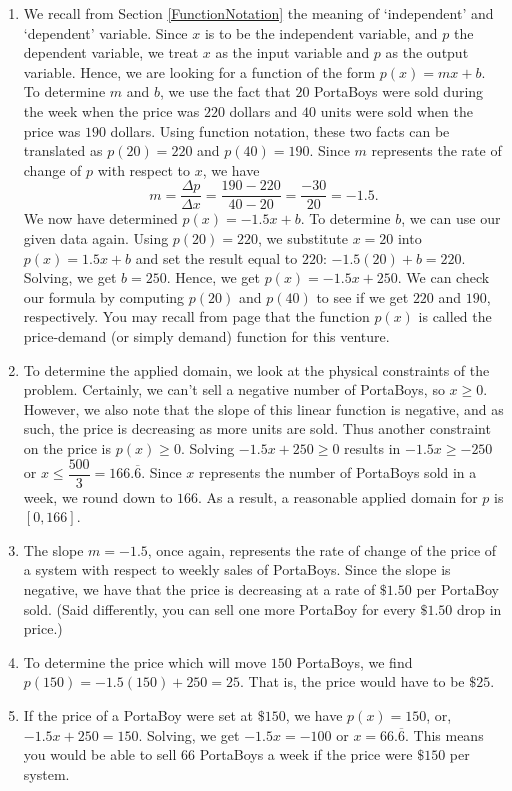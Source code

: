 {
\begin{enumerate}

\item  We recall from Section \ref{FunctionNotation} the meaning of `independent' and `dependent' variable.  Since $x$ is to be the independent variable, and $p$ the dependent variable, we treat $x$ as the input variable and $p$ as the output variable.  Hence, we are looking for a function of the form $p(x) = mx + b$.  To determine $m$ and $b$, we use the fact that $20$ PortaBoys were sold during the week when the price was $220$ dollars and $40$ units were sold when the price was $190$ dollars.  Using function notation, these two facts can be translated as $p(20)=220$ and $p(40)=190$.  Since $m$ represents the rate of change of $p$ with respect to $x$, we have  \[ m = \dfrac{\Delta p}{\Delta x} = \dfrac{190-220}{40-20} = \dfrac{-30}{20} = -1.5.\]  We now have determined $p(x) = -1.5 x + b$.  To determine $b$, we can use our given data again.  Using $p(20) = 220$, we substitute $x=20$ into $p(x) = 1.5x + b$ and set the result equal to $220$:  $-1.5(20)+b = 220$.  Solving, we get  $b = 250$. Hence, we get $p(x) = -1.5x + 250$.  We can check our formula by computing $p(20)$ and $p(40)$ to see if we get $220$ and $190$, respectively.  You may recall from page \pageref{pricerevenuecostprofit} that the function $p(x)$ is called the price-demand (or simply demand) function for this venture.

\item  To determine the applied domain, we look at the physical constraints of the problem.  Certainly, we can't sell a negative number of PortaBoys, so $x \geq 0$. However, we also note that the slope of this linear function is negative, and as such, the price is decreasing as more units are sold.  Thus another constraint on the price is $p(x)\geq 0$.  Solving $-1.5 x + 250 \geq 0$ results in $-1.5 x \geq -250$ or $x \leq \dfrac{500}{3} = 166.\overline{6}$.  Since $x$ represents the number of PortaBoys sold in a week, we round down to $166$.  As a result, a reasonable applied domain for $p$ is $[0,166]$.  

\item The slope $m = -1.5$, once again, represents the rate of change of the price of a system with respect to weekly sales of PortaBoys.  Since the slope is negative, we have that the price is decreasing at a rate of $\$1.50$ per PortaBoy sold.  (Said differently, you can sell one more PortaBoy for every $\$1.50$ drop in price.)

\item  To determine the price which will move $150$ PortaBoys, we find $p(150) = -1.5(150) + 250 = 25$.  That is, the price would have to be $\$25$.

\item  If the price of a PortaBoy were set at $\$150$, we have $p(x) = 150$, or, $-1.5x + 250 = 150$.  Solving, we get $-1.5x = -100$ or $x = 66.\overline{6}$. This means you would be able to sell $66$ PortaBoys a week if the price were $\$150$ per system.

\end{enumerate}
}

